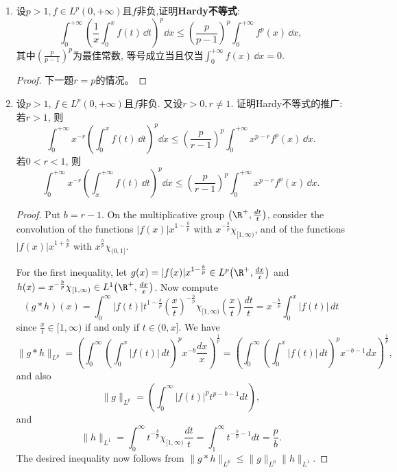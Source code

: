 \begin{b}
\begin{enumerate}
\begin{proof}[解答]
记$\{a_n\}_{n\geqslant1}$为$[0,1]$中全体有理数的罗列，
当$a_n+\pi/m\in[0,1]$时，取$f(a_n+\pi/m)=a_m$，其余点处$f$的值随便取。
\end{proof}
\item 设\(p>1,f\in L^p(0,+\infty)\)且\(f\)非负,证明\textbf{Hardy不等式}:
\[\int_{0}^{+\infty}\left(\frac{1}{x}\int_{0}^{x}f(t)\,\dd t\right)^p\dd x
\leqslant\left(\frac{p}{p-1}\right)^p\int_{0}^{+\infty}f^p(x)\,\dd x,\]
其中\(\left(\frac{p}{p-1}\right)^p\)为最佳常数, 
等号成立当且仅当\(\int_{0}^{+\infty}f(x)\,\dd x=0\).
\begin{proof}
下一题\(r=p\)的情况。
\end{proof}
\item 设\(p>1\), \(f\in L^p(0,+\infty)\)且\(f\)非负. 又设\(r>0,r\ne 1\). 
证明Hardy不等式的推广: 若\(r>1\), 则
\[\int_{0}^{+\infty}x^{-r}\left(\int_{0}^{x}f(t)\,\dd t\right)^p\dd x
\leqslant\left(\frac{p}{r-1}\right)^p\int_{0}^{+\infty}x^{p-r}f^p(x)\,\dd x.\]
若\(0<r<1\), 则\[\int_{0}^{+\infty}x^{-r}\left(\int_{x}^{+\infty}f(t)\,\dd t\right)^p\dd x
\leqslant\left(\frac{p}{r-1}\right)^p\int_{0}^{+\infty}x^{p-r}f^p(x)\,\dd x.\]
\begin{proof}
Put $b=r-1$. On the multiplicative group $\left(\R^{+}, \frac{d t}{t}\right)$, 
consider the convolution of the functions $|f(x)| x^{1-\frac{b}{p}}$ 
with $x^{-\frac{b}{p}} \chi_{[1, \infty)}$, 
and of the functions $|f(x)| x^{1+\frac{b}{p}}$ 
with $x^{\frac{b}{p}} \chi_{(0,1]}$.

For the first inequality, let $g(x)=|f(x)| x^{1-\frac{b}{p}} \in L^p\big(\R^{+}, \frac{d x}{x}\big)$ 
and $h(x)=x^{-\frac{b}{p}} \chi_{[1, \infty)} \in L^1\big(\R^{+}, \frac{d x}{x}\big)$. 
Now compute
$$(g * h)(x)=\int_0^{\infty}|f(t)| t^{1-\frac{b}{p}}\left(\frac{x}{t}\right)^{-\frac{b}{p}} \chi_{[1, \infty)}\left(\frac{x}{t}\right) \frac{d t}{t}
=x^{-\frac{b}{p}} \int_0^x|f(t)| \, d t$$
since $\frac{x}{t} \in[1, \infty)$ if and only if $t \in(0, x]$. We have
$$\|g * h\|_{L^p}=\left(\int_0^{\infty}\left(\int_0^x|f(t)| \, d t\right)^p x^{-b} \frac{d x}{x}\right)^{\frac{1}{p}}
=\left(\int_0^{\infty}\left(\int_0^x|f(t)| \, d t\right)^p x^{-b-1} d x\right)^{\frac{1}{p}},$$
and also
$$\|g\|_{L^p}=\left(\int_0^{\infty}|f(t)|^p t^{p-b-1} d t\right),$$
and
$$\|h\|_{L^1}=\int_0^{\infty} t^{-\frac{b}{p}} \chi_{[1, \infty)} \frac{d t}{t}
=\int_1^{\infty} t^{-\frac{b}{p}-1} d t=\frac{p}{b}.$$
The desired inequality now follows from $\|g*h\|_{L^p}\leqslant\|g\|_{L^p}\|h\|_{L^1}$.


\end{proof}
\end{enumerate}
\end{b}
